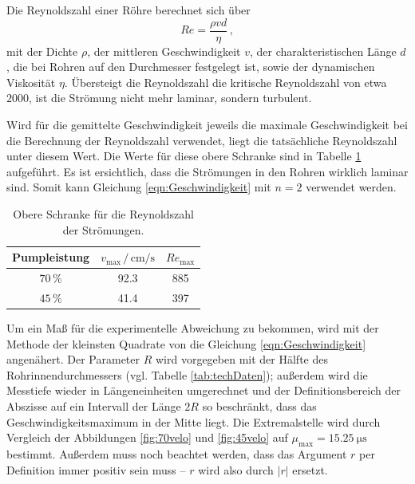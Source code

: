 Die Reynoldszahl einer Röhre berechnet sich über 
\begin{equation}
    Re=\frac{\rho v d}{\eta}\,,
\end{equation}
mit der Dichte $\rho$, der mittleren Geschwindigkeit $v$, der charakteristischen Länge $d$, die bei Rohren auf den Durchmesser festgelegt ist, 
sowie der dynamischen Viskosität $\eta$. 
Übersteigt die Reynoldszahl die kritische Reynoldszahl von etwa $2000$, ist die Strömung nicht mehr laminar, sondern turbulent. 

Wird für die gemittelte Geschwindigkeit jeweils die maximale Geschwindigkeit bei die Berechnung der Reynoldszahl verwendet, 
liegt die tatsächliche Reynoldszahl unter diesem Wert. 
Die Werte für diese obere Schranke sind in Tabelle \ref{tab:Reynoldszahl} aufgeführt. 
Es ist ersichtlich, dass die Strömungen in den Rohren wirklich laminar sind. 
Somit kann Gleichung \eqref{eqn:Geschwindigkeit} mit $n=2$ verwendet werden. 
\begin{table}
    \centering
    \caption{Obere Schranke für die Reynoldszahl der Strömungen.}
    \label{tab:Reynoldszahl}
    \begin{tabular}{c c c}
        \toprule
        Pumpleistung & $v_\text{max}\,/\,\si{\centi\meter\per\second}$ & $Re_\text{max}$ \\
        \midrule
        $70\,\%$ & 92.3 & 885 \\
        $45\,\%$ & 41.4 & 397 \\        
        \bottomrule
    \end{tabular}
\end{table}

Um ein Maß für die experimentelle Abweichung zu bekommen, wird mit der Methode der kleinsten Quadrate von \cite{scipy} 
die Gleichung \eqref{eqn:Geschwindigkeit} angenähert. 
Der Parameter $R$ wird vorgegeben mit der Hälfte des Rohrinnendurchmessers (vgl. Tabelle \ref{tab:techDaten}); außerdem wird die Messtiefe wieder in Längeneinheiten umgerechnet und der Definitionsbereich 
der Abszisse auf ein Intervall der Länge $2R$ so beschränkt, dass das Geschwindigkeitsmaximum in der Mitte liegt. 
Die Extremalstelle wird durch Vergleich der Abbildungen \ref{fig:70velo} und \ref{fig:45velo} auf $\mu_\text{max}=\SI{15.25}{\micro\second}$
bestimmt. 
Außerdem muss noch beachtet werden, dass das Argument $r$ per Definition immer positiv sein muss -- $r$ wird also durch $|r|$ ersetzt. 

